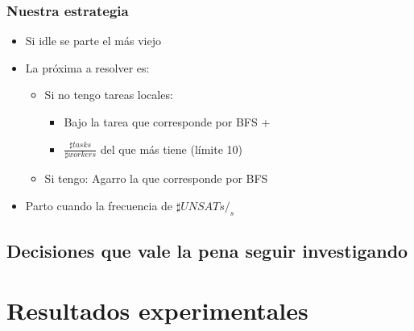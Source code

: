 \subsubsection{Nuestra estrategia}

\begin{itemize}
	\item Si idle se parte el más viejo
	\item La próxima a resolver es:
		\begin{itemize}
			\item Si no tengo tareas locales:
				\begin{itemize}
					\item Bajo la tarea que corresponde por BFS +
					\item $\frac{\sharp tasks}{\sharp workers}$ del que más tiene (límite 10)
				\end{itemize}
			\item Si tengo: Agarro la que corresponde por BFS
		\end{itemize}
	\item Parto cuando la frecuencia de $\sharp UNSATs/_s$
\end{itemize}

\subsection{Decisiones que vale la pena seguir investigando}

\section{Resultados experimentales}